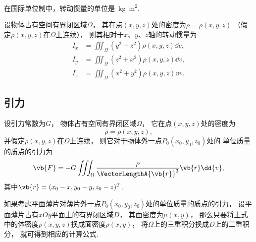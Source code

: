 在国际单位制中，转动惯量的单位是~\unit{\kilo\gram.\square\meter}.

\begin{theorem}
设物体占有空间有界闭区域\(\Omega\)，
其在点\((x,y,z)\)处的密度为\(\rho=\rho(x,y,z)\)
（假定\(\rho(x,y,z)\)在\(\Omega\)上连续），
则其相对于\(x\)、\(y\)、\(z\)轴的转动惯量为\begin{align}
	I_x &= \iiint_\Omega (y^2+z^2) \rho(x,y,z) \dd{v}, \\
	I_y &= \iiint_\Omega (z^2+x^2) \rho(x,y,z) \dd{v}, \\
	I_z &= \iiint_\Omega (x^2+y^2) \rho(x,y,z) \dd{v}.
\end{align}
\end{theorem}

\subsection{引力}
\begin{theorem}
设引力常数为\(G\)，
物体占有空间有界闭区域\(\Omega\)，
它在点\((x,y,z)\)处的密度为\begin{equation*}
	\rho=\rho(x,y,z),
\end{equation*}
并假定\(\rho(x,y,z)\)在\(\Omega\)上连续，
则它对于物体外一点\(P_0(x_0,y_0,z_0)\)处的
单位质量的质点的引力为\begin{equation}
	\vb{F}
	= -G \iiint_\Omega \frac{\rho}{\VectorLengthA{\vb{r}}^3} \vb{r} \dd{v},
\end{equation}
其中\(\vb{r}
= (x_0-x,y_0-y,z_0-z)^T\).
\end{theorem}

如果考虑平面薄片对薄片外一点\(P_0(x_0,y_0,z_0)\)处的单位质量的质点的引力，
设平面薄片占有\(xOy\)平面上的有界闭区域\(D\)，
其面密度为\(\mu(x,y)\)，
那么只要将上式中的体密度\(\rho(x,y,z)\)换成面密度\(\rho(x,y)\)，
将\(\Omega\)上的三重积分换成\(D\)上的二重积分，
就可得到相应的计算公式.
